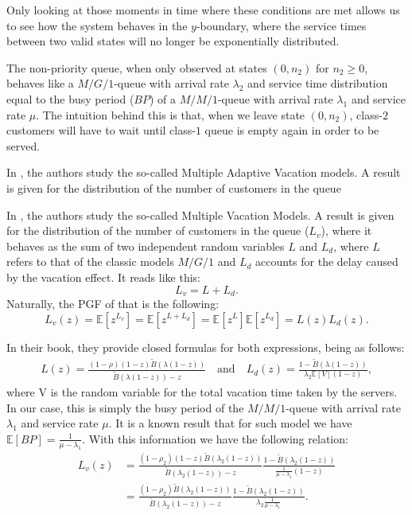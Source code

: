 Only looking at those moments in time where these conditions are met allows us to see how the system behaves in the $y$-boundary, where the service times between two valid states will no longer be exponentially distributed.

The non-priority queue, when only observed at states $(0,n_2)$ for $n_2 \geq 0$, behaves like a $M/G/1$-queue with arrival rate $\lambda_2$ and service time distribution equal to the busy period ($BP$) of a $M/M/1$-queue with arrival rate $\lambda_1$ and service rate $\mu$. The intuition behind this is that, when we leave state $(0,n_2)$, class-$2$ customers will have to wait until class-$1$ queue is empty again in order to be served.

In \cite{tian2006vacation}, the authors study the so-called Multiple Adaptive Vacation models. A result is given for the distribution of the number of customers in the queue 

In \cite{tian2006vacation}, the authors study the so-called Multiple Vacation Models. A result is given for the distribution of the number of customers in the queue ($L_v$), where it behaves as the sum of two independent random variables $L$ and $L_d$, where $L$ refers to that of the classic models $M/G/1$ and $L_d$ accounts for the delay caused by the vacation effect. It reads like this:
\begin{equation*}
    L_v = L+ L_d.
\end{equation*}
Naturally, the PGF of that is the following:
\begin{equation}
    L_v(z) = \mathbb{E}\left[ z^{L_v} \right]
    = \mathbb{E}\left[ z^{L + L_d} \right]
    = \mathbb{E}\left[ z^{L} \right] \mathbb{E}\left[ z^{L_d} \right] = L(z) L_d(z).
\end{equation}

In their book, they provide closed formulas for both expressions, being as follows:
\begin{align*}
    L(z) = \frac{(1-\rho) (1-z) \widetilde{B}(\lambda(1-z))}{\widetilde{B}(\lambda(1-z)) - z}
     \quad \text{and} \quad
     L_d(z) = \frac{1 - \widetilde{B}(\lambda(1-z))}{ \lambda_2\mathbb{E}\left[V\right] (1-z)},
\end{align*}
where V is the random variable for the total vacation time taken by the servers. In our case, this is simply the busy period of the $M/M/1$-queue with arrival rate $\lambda_1$ and service rate $\mu$. It is a known result that for such model we have $\mathbb{E} \left[ BP \right] = \frac{1}{\mu - \lambda_1}$. With this information we have the following relation:
\begin{align*}
    L_v(z) 
    &= \frac{(1-\rho_2) (1-z) \widetilde{B}(\lambda_2(1-z))}{\widetilde{B}(\lambda_2(1-z)) - z}
    \frac{1 - \widetilde{B}(\lambda_2(1-z))}{\frac{1}{\mu - \lambda_1} (1-z)} \\
    &= \frac{(1-\rho_2) \widetilde{B}(\lambda_2(1-z))}{\widetilde{B}(\lambda_2(1-z)) - z}
    \frac{1 - \widetilde{B}(\lambda_2(1-z))}{\lambda_2\frac{1}{\mu - \lambda_1}}.
\end{align*}

